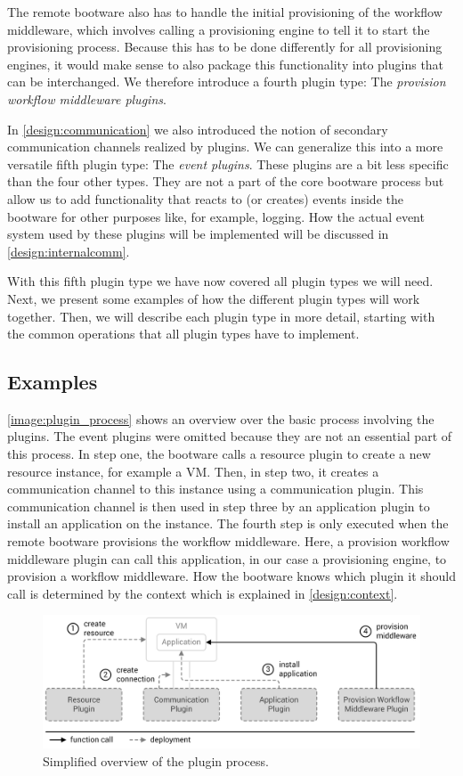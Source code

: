 The remote bootware also has to handle the initial provisioning of the workflow middleware, which involves calling a provisioning engine to tell it to start the provisioning process.
Because this has to be done differently for all provisioning engines, it would make sense to also package this functionality into plugins that can be interchanged.
We therefore introduce a fourth plugin type: The \textit{provision workflow middleware plugins}.

In \autoref{design:communication} we also introduced the notion of secondary communication channels realized by plugins.
We can generalize this into a more versatile fifth plugin type: The \textit{event plugins}.
These plugins are a bit less specific than the four other types.
They are not a part of the core bootware process but allow us to add functionality that reacts to (or creates) events inside the bootware for other purposes like, for example, logging.
How the actual event system used by these plugins will be implemented will be discussed in \autoref{design:internalcomm}.

With this fifth plugin type we have now covered all plugin types we will need.
Next, we present some examples of how the different plugin types will work together.
Then, we will describe each plugin type in more detail, starting with the common operations that all plugin types have to implement.

\subsection{Examples}

\autoref{image:plugin_process} shows an overview over the basic process involving the plugins.
The event plugins were omitted because they are not an essential part of this process.
In step one, the bootware calls a resource plugin to create a new resource instance, for example a VM.
Then, in step two, it creates a communication channel to this instance using a communication plugin.
This communication channel is then used in step three by an application plugin to install an application on the instance.
The fourth step is only executed when the remote bootware provisions the workflow middleware.
Here, a provision workflow middleware plugin can call this application, in our case a provisioning engine, to provision a workflow middleware.
How the bootware knows which plugin it should call is determined by the context which is explained in \autoref{design:context}.

\begin{figure}[!htbp]
	\centering
	\includegraphics[resolution=600]{design/assets/plugin_process}
	\caption{Simplified overview of the plugin process.}
	\label{image:plugin_process}
\end{figure}

